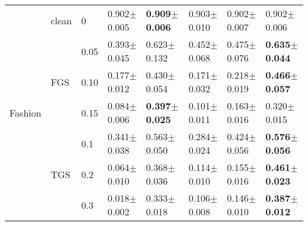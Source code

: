 \documentclass[10pt,journal,compsoc]{IEEEtran}
\begin{document}
\begin{table*}[]
{\begin{tabular}{clllllll}
\multirow{7}{*}{Fashion}                      & clean                & 0            & 0.902$\pm$0.005  & \textbf{0.909}$\pm$\textbf{0.006}   & 0.903$\pm$0.010 & 0.902$\pm$0.007 & 0.902$\pm$0.006 \\
                                              & \multirow{3}{*}{FGS} & 0.05         & 0.393$\pm$0.045  & 0.623$\pm$0.132   & 0.452$\pm$0.068 & 0.475$\pm$0.076 & \textbf{0.635}$\pm$\textbf{0.044} \\
                                              &                      & 0.10         & 0.177$\pm$0.012  & 0.430$\pm$0.054   & 0.171$\pm$0.032 & 0.218$\pm$0.019 & \textbf{0.466}$\pm$\textbf{0.057} \\
                                              &                      & 0.15         & 0.084$\pm$0.006  & \textbf{0.397}$\pm$\textbf{0.025}   & 0.101$\pm$0.011 & 0.163$\pm$0.016 & 0.320$\pm$0.015 \\
                                              & \multirow{3}{*}{TGS} & 0.1          & 0.341$\pm$0.038  & 0.563$\pm$0.050   & 0.284$\pm$0.024 & 0.424$\pm$0.056 & \textbf{0.576}$\pm$\textbf{0.056} \\
                                              &                      & 0.2          & 0.064$\pm$0.010  & 0.368$\pm$0.036   & 0.114$\pm$0.010 & 0.155$\pm$0.016 & \textbf{0.461}$\pm$\textbf{0.023} \\
                                              &                      & 0.3          & 0.018$\pm$0.002  & 0.333$\pm$0.018   & 0.106$\pm$0.008 & 0.146$\pm$0.010 & \textbf{0.387}$\pm$\textbf{0.012} \\ \midrule[0.5pt]




\end{tabular}}
\end{table*}
\end{document}
